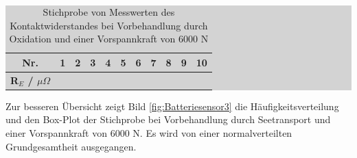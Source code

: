 \begin{table}[H]
\caption{Stichprobe von Messwerten des Kontaktwiderstandes bei Vorbehandlung durch Oxidation und einer Vorspannkraft von 6000 N}
\setlength{\fboxsep}{0pt}%
\colorbox{lightgray}{%
%
\begin{tabular}{| c | c | c | c | c | c | c | c | c | c | c |}
\hline

\parbox[c][0.28in][c]{0.5in}{\smallskip\centering{}\selectfont\textbf{Nr.}} &
\parbox[c][0.28in][c]{0.45in}{\centering{}\selectfont\textbf{1}} &
\parbox[c][0.28in][c]{0.45in}{\centering{}\selectfont\textbf{2}} &
\parbox[c][0.28in][c]{0.45in}{\centering{}\selectfont\textbf{3}} &
\parbox[c][0.28in][c]{0.45in}{\centering{}\selectfont\textbf{4}} &
\parbox[c][0.28in][c]{0.45in}{\centering{}\selectfont\textbf{5}} &
\parbox[c][0.28in][c]{0.45in}{\centering{}\selectfont\textbf{6}} &
\parbox[c][0.28in][c]{0.45in}{\centering{}\selectfont\textbf{7}} &
\parbox[c][0.28in][c]{0.45in}{\centering{}\selectfont\textbf{8}} &
\parbox[c][0.28in][c]{0.45in}{\centering{}\selectfont\textbf{9}} &
\parbox[c][0.28in][c]{0.45in}{\centering{}\selectfont\textbf{10}} \\ \hline

\parbox[c][0.35in][c]{0.5in}{\smallskip\centering{}\selectfont\textbf{R$_{E}$ / $\mu \Omega$}} &
\parbox[c][0.35in][c]{0.45in}{\centering{}\selectfont{3.984}} &
\parbox[c][0.35in][c]{0.45in}{\centering{}\selectfont{7.349}} &
\parbox[c][0.35in][c]{0.45in}{\centering{}\selectfont{6.451}} &
\parbox[c][0.35in][c]{0.45in}{\centering{}\selectfont{5.952}} &
\parbox[c][0.35in][c]{0.45in}{\centering{}\selectfont{7.076}} &
\parbox[c][0.35in][c]{0.45in}{\centering{}\selectfont{13.633}} &
\parbox[c][0.35in][c]{0.45in}{\centering{}\selectfont{10.065}} &
\parbox[c][0.35in][c]{0.45in}{\centering{}\selectfont{5.478}} &
\parbox[c][0.35in][c]{0.45in}{\centering{}\selectfont{9.529}} &
\parbox[c][0.35in][c]{0.45in}{\centering{}\selectfont{5.263}} \\ \hline

\end{tabular}%
}\bigskip
\label{tab:fivetwentyone}
\end{table}

\noindent Zur besseren \"{U}bersicht zeigt Bild \ref{fig:Batteriesensor3} die H\"{a}ufigkeitsverteilung und den Box-Plot der Stichprobe bei Vorbehandlung durch Seetransport und einer Vorspannkraft von 6000 N. Es wird von einer normalverteilten Grundgesamtheit ausgegangen. 

